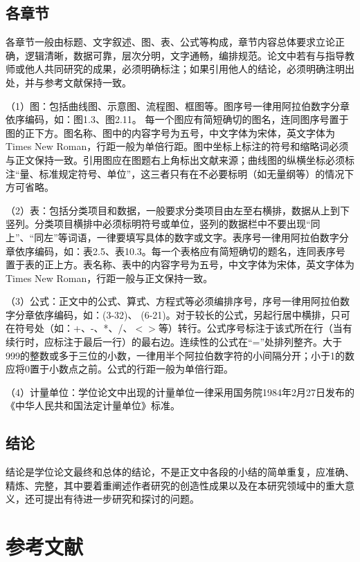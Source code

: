 \subsection{各章节}

各章节一般由标题、文字叙述、图、表、公式等构成，章节内容总体要求立论正确，逻辑清晰，数据可靠，层次分明，文字通畅，编排规范。论文中若有与指导教师或他人共同研究的成果，必须明确标注；如果引用他人的结论，必须明确注明出处，并与参考文献保持一致。

（1）图：包括曲线图、示意图、流程图、框图等。图序号一律用阿拉伯数字分章依序编码，如：图1.3、图2.11。 每一个图应有简短确切的图名，连同图序号置于图的正下方。图名称、图中的内容字号为五号，中文字体为宋体，英文字体为Times New Roman，行距一般为单倍行距。图中坐标上标注的符号和缩略词必须与正文保持一致。引用图应在图题右上角标出文献来源；曲线图的纵横坐标必须标注“量、标准规定符号、单位”，这三者只有在不必要标明（如无量纲等）的情况下方可省略。

（2）表：包括分类项目和数据，一般要求分类项目由左至右横排，数据从上到下竖列。分类项目横排中必须标明符号或单位，竖列的数据栏中不要出现“同上”、“同左”等词语，一律要填写具体的数字或文字。表序号一律用阿拉伯数字分章依序编码，如：表2.5、表10.3。每一个表格应有简短确切的题名，连同表序号置于表的正上方。表名称、表中的内容字号为五号，中文字体为宋体，英文字体为Times New Roman，行距一般与正文保持一致。

（3）公式：正文中的公式、算式、方程式等必须编排序号，序号一律用阿拉伯数字分章依序编码，如：(3-32)、 (6-21)。对于较长的公式，另起行居中横排，只可在符号处（如：+、-、*、/、$<$$>$等）转行。公式序号标注于该式所在行（当有续行时，应标注于最后一行）的最右边。连续性的公式在“=”处排列整齐。大于999的整数或多于三位的小数，一律用半个阿拉伯数字符的小间隔分开；小于1的数应将0置于小数点之前。公式的行距一般为单倍行距。

（4）计量单位：学位论文中出现的计量单位一律采用国务院1984年2月27日发布的《中华人民共和国法定计量单位》标准。

\subsection{结论}

结论是学位论文最终和总体的结论，不是正文中各段的小结的简单重复，应准确、精炼、完整，其中要着重阐述作者研究的创造性成果以及在本研究领域中的重大意义，还可提出有待进一步研究和探讨的问题。

\section{参考文献}

